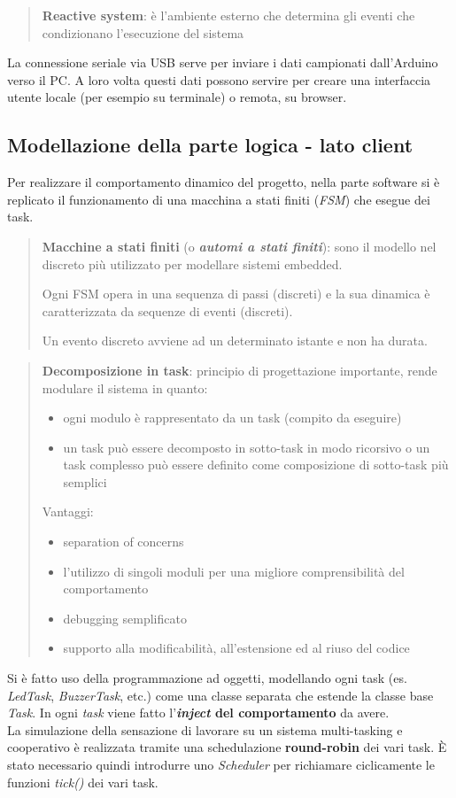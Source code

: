	\begin{quote}
		\textbf{Reactive system}: è l’ambiente esterno che determina gli eventi che	condizionano l’esecuzione del sistema
	\end{quote}	
La connessione seriale via USB serve per inviare i dati campionati dall'Arduino verso il PC. A loro volta questi dati possono servire per creare una interfaccia utente locale (per esempio su terminale) o remota, su browser.

\subsection{Modellazione della parte logica - lato client}
Per realizzare il comportamento dinamico del progetto, nella parte software si è replicato il funzionamento di una macchina a stati finiti (\textit{FSM}) che esegue dei task.

	\begin{quote}
		\textbf{Macchine a stati finiti} (o \textbf{\textit{automi a stati finiti}}): sono il modello nel discreto più utilizzato per modellare sistemi embedded.
		
		Ogni FSM opera in una sequenza di passi (discreti) e la sua dinamica è caratterizzata da sequenze di eventi (discreti).
		
		Un evento discreto avviene ad un determinato istante e non ha durata.
	\end{quote}
	
	\begin{quote}
		\textbf{Decomposizione in task}: principio di progettazione importante, rende modulare il sistema in quanto:
		\begin{itemize}
			\item ogni modulo è rappresentato da un task (compito da eseguire)
			\item un task può essere decomposto in sotto-task in modo ricorsivo o un task complesso può essere definito come composizione di sotto-task più semplici
		\end{itemize}
		Vantaggi:
		\begin{itemize}
			\item separation of concerns
			\item l'utilizzo di singoli moduli per una migliore comprensibilità del comportamento
			\item debugging semplificato
			\item supporto alla modificabilità, all'estensione ed al riuso del codice
		\end{itemize}
	\end{quote}	
Si è fatto uso della programmazione ad oggetti, modellando ogni task (es. \textit{LedTask}, \textit{BuzzerTask}, etc.) come una classe separata che estende la classe base \textit{Task}. In ogni \textit{task} viene fatto l'\textbf{\textit{inject} del comportamento} da avere.\\
La simulazione della sensazione di lavorare su un sistema multi-tasking e cooperativo è realizzata tramite una schedulazione \textbf{round-robin} dei vari task. È stato necessario quindi introdurre uno \textit{Scheduler} per richiamare ciclicamente le funzioni \textit{tick()} dei vari task.


